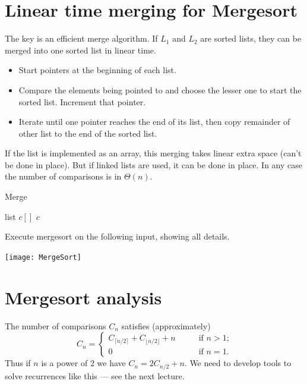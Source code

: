 \section{Linear time merging for Mergesort}
The key is an efficient merge algorithm. 
If $L_1$ and $L_2$ are sorted lists, they can be merged into one sorted 
list in linear time.
\begin{itemize}
\item Start pointers at the beginning of each list. 
\item Compare the elements being pointed 
to and choose the lesser one to start the sorted list. Increment that pointer. 
\item Iterate until one pointer reaches the end of its list, then 
copy remainder of other list to the end of the sorted list.
\end{itemize} 
If the list is implemented as an array, this merging takes linear extra 
space (can't be done in place). But if linked lists are used, it can be done in 
place. In any case the number of comparisons is in $\Theta(n)$.


\begin{algorithm}[H]
  \caption{Merge}
    \label{alg:merge}
\begin{algorithmic}[0]
	\State list $c[]$
			\State \Return $c$
		\EndIf
 	\EndWhile
\EndFunction  
\end{algorithmic}
\end{algorithm}
\fi
\begin{Boxample}[0]
Execute mergesort on the following input, showing all details.
\begin{center}
\texttt{[image: MergeSort]} 
\end{center}
\end{Boxample}

\section{Mergesort analysis}
The number of comparisons $C_n$ satisfies (approximately)
$$ C_n  = \left\{
\begin{array}{ll}
	C_{\lceil n/2 \rceil} + C_{\lfloor n/2 \rfloor} + n & \qquad \text{if }n > 1\text{;} \\
														0 & \qquad \text{if }n = 1\text{.}
\end{array}\right.$$
Thus if $n$ is a power of 2 we have $C_n = 2C_{n/2} + n$. We need to develop tools to solve recurrences like this --- see the next lecture.

